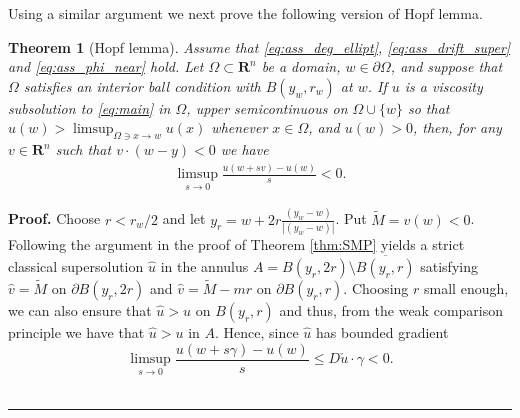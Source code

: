 \documentclass[12pt]{article}
\newtheorem{theorem}{Theorem}
\newenvironment{proof}[1][Proof]{\textbf{#1.} }{\ \rule{0.5em}{0.5em}}
\newcommand{\blue}{\color{blau}}
\newcounter{komcounter}
\numberwithin{komcounter}{section}
\newcommand{\komM}[1]{{\bf \blue [\refstepcounter{komcounter}\thekomcounter (by M): #1]}}
\begin{document}

Using a similar argument we next prove the following version of Hopf lemma.

%
%








\begin{theorem}[Hopf lemma]\label{corr:hopf}
Assume that \eqref{eq:ass_deg_ellipt}, \eqref{eq:ass_drift_super} and \eqref{eq:ass_phi_near} hold.
Let $\Omega \subset \mathbf{R}^n$ be a domain,
$w\in \partial \Omega$,
and suppose that $\Omega$ satisfies an interior ball condition with $B(y_w, r_w)$ at $w$.
If $u$ is a viscosity subsolution to \eqref{eq:main} in $\Omega$,
upper semicontinuous on $\Omega \cup \{w\}$ so that $u(w) > \limsup_{\Omega \ni x \to w} u(x)$ whenever $x \in \Omega$, and $u(w) > 0$,
then, for any $v\in \mathbf R^n$ such that $ v \cdot (w - y) < 0$ we have
%
\begin{align*}
\limsup_{s \to 0} \frac{u(w + s v) - u(w)}{s} < 0.
\end{align*}
%
\end{theorem}

\noindent
\begin{proof}
Choose $r < r_w/2$ and let $y_r= w + 2r \frac{(y_w-w)}{|(y_w-w)|}$.
Put $\tilde{M} = v(w)<0$.
Following the argument in the proof of Theorem \ref{thm:SMP} yields a strict classical supersolution $\hat u$
in the annulus $A = B(y_r,2r)\setminus \overline{B(y_r,r)}$ satisfying
$\hat{v} = \tilde M$ on $\partial B(y_r, 2r)$ and $\hat{v} = \tilde M - mr$ on $\partial B(y_r, r)$.
Choosing $r$ small enough, we can also ensure that $\hat u > u$ on $B(y_r,r)$ and thus,
from the weak comparison principle we have that $\hat{u} > u$ in $A$.
Hence, since $\hat{u}$ has bounded gradient
%
$$
\limsup_{s \to 0} \frac{u(w + s \gamma) - u(w)}{s} \leq D\check{u} \cdot \gamma < 0.
$$
%
\end{proof}\\
\end{document}

